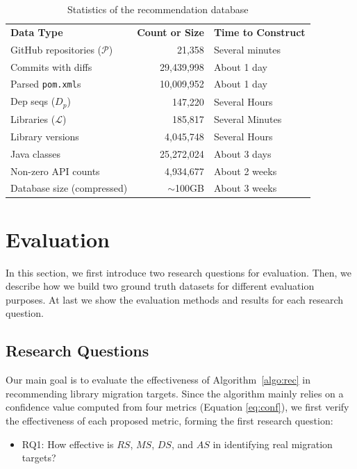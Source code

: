 \documentclass[conference, 10pt]{IEEEtran}
\begin{document}
\begin{table}[]
\caption{Statistics of the recommendation database}
\centering
\begin{tabular}{|l|r|l|}
\hline
\textbf{Data Type} & \textbf{Count or Size} & \textbf{Time to Construct}  \\ \hhline{|=|=|=|}
GitHub repositories ($\mathcal{P}$) & 21,358 & Several minutes   \\ \hline
Commits with diffs                  & 29,439,998  & About 1 day  \\ \hline
Parsed \texttt{pom.xml}s            & 10,009,952  & About 1 day  \\ \hline
Dep seqs ($D_p$) & 147,220          & Several Hours \\ \hline
Libraries ($\mathcal{L}$)           & 185,817  & Several Minutes  \\ \hline
Library versions                    & 4,045,748  & Several Hours  \\ \hline
Java classes                        & 25,272,024  & About 3 days  \\ \hline
Non-zero API counts                 & 4,934,677 & About 2 weeks \\ \hline
Database size (compressed)          & $\sim$100GB & About 3 weeks \\ \hline
\end{tabular}
\label{tab:db}
\end{table}

\section{Evaluation}
\label{sec:evaluation}

In this section, we first introduce two research questions for evaluation.
Then, we describe how we build two ground truth datasets for different evaluation purposes. 
At last we show the evaluation methods and results for each research question.

\subsection{Research Questions}

Our main goal is to evaluate the effectiveness of Algorithm~\ref{algo:rec} in recommending library migration targets.
Since the algorithm mainly relies on a confidence value computed from four metrics (Equation \ref{eq:conf}), we first verify the effectiveness of each proposed metric, forming the first research question:
\begin{itemize}
    \item RQ1: How effective is $RS$, $MS$, $DS$, and $AS$ in identifying real migration targets? %
\end{itemize}
\end{document}
